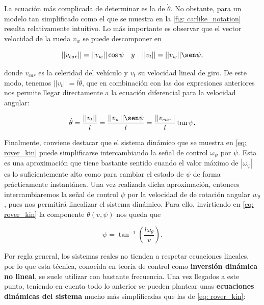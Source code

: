 \newpage
La ecuación más complicada de determinar es la de $\dot \theta$. No obstante, para un modelo tan simplificado como el que se muestra en la \autoref{fig: carlike_notation} resulta relativamente intuitivo. Lo más importante es observar que el vector velocidad de la rueda $v_w$ se puede descomponer en

$$ ||v_{car}|| = ||v_{w}||\cos\psi \quad y \quad ||v_{t}|| = ||v_{w}||\sen\psi, $$

donde $v_{car}$ es la celeridad del vehículo y $v_t$ su velocidad lineal de giro. De este modo, tenemos $||v_{t}|| = l\dot\theta$, que en combinación con las dos expresiones anteriores nos permite llegar directamente a la ecuación diferencial para la velocidad angular:

$$ \dot \theta = \frac{||v_{t}||}{l} = \frac{||v_{w}||\sen\psi}{l} = \frac{||v_{car}||}{l}\tan\psi. $$

Finalmente, conviene destacar que el sistema dinámico que se muestra en \eqref{eq: rover_kin} puede simplificarse intercambiando la señal de control $\omega_{\psi}$ por $\psi$. Esta es una aproximación que tiene bastante sentido cuando el valor máximo de $|\omega_\psi|$ es lo suficientemente alto como para cambiar el estado de $\psi$ de forma prácticamente instantánea. Una vez realizada dicha aproximación, entonces intercambiaremos la señal de control $\psi$ por la velocidad de de rotación angular $w_\theta$, pues nos permitirá linealizar el sistema dinámico. Para ello, invirtiendo en \eqref{eq: rover_kin} la componente $\dot \theta(v,\psi)$ nos queda que

\begin{equation} \label{eq: omega_psi}
    \psi = \tan^{-1}\left( \frac{l \omega_\theta}{v}\right).
\end{equation}

Por regla general, los sistemas reales no tienden a respetar ecuaciones lineales, por lo que esta técnica, conocida en teoría de control como \textbf{inversión dinámica no lineal}, se suele utilizar con bastante frecuencia. Una vez llegados a este punto, teniendo en cuenta todo lo anterior se pueden plantear unas \textbf{ecuaciones dinámicas del sistema} mucho más simplificadas que las de \eqref{eq: rover_kin}: 

